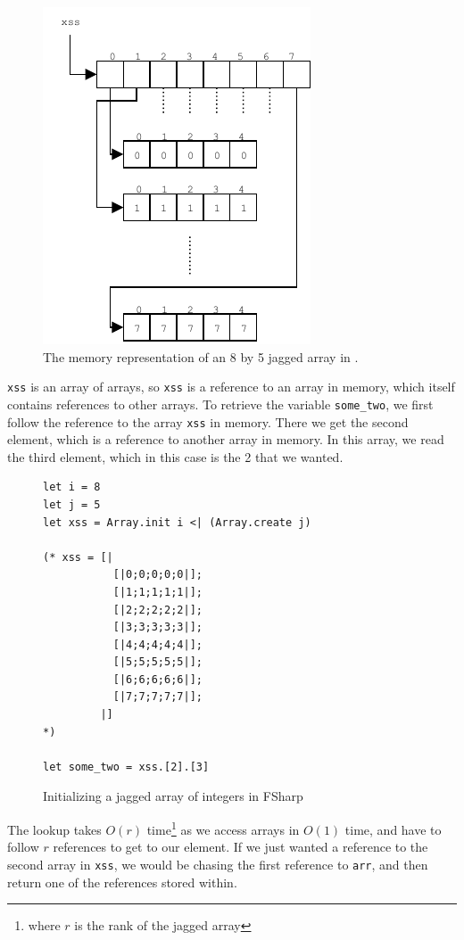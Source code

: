 \begin{figure}
  \centering
  \includegraphics[scale=2]{chapters/figs/jaggedarrays.pdf}
  \caption{The memory representation of an 8 by 5 jagged array in \csharp{}.}
  \label{fig:jaggedarraydrawing}
\end{figure}


\texttt{xss} is an array of arrays, so \texttt{xss} is a reference to an array
in memory, which itself contains references to other arrays.
To retrieve the variable \texttt{some\_two}, we first follow the reference to
the array \texttt{xss} in memory. There we get the second element, which is a
reference to another array in memory. In this array, we read the third element,
which in this case is the 2 that we wanted.

\begin{figure}[h]
  \centering
\begin{verbatim}
let i = 8
let j = 5
let xss = Array.init i <| (Array.create j) 
  
(* xss = [|
           [|0;0;0;0;0|];
           [|1;1;1;1;1|];
           [|2;2;2;2;2|];
           [|3;3;3;3;3|];
           [|4;4;4;4;4|];
           [|5;5;5;5;5|];
           [|6;6;6;6;6|];
           [|7;7;7;7;7|];
         |]
*) 

let some_two = xss.[2].[3]

\end{verbatim}
  \caption{Initializing a jagged array of integers in FSharp}
  \label{fig:jaggedarrayfsharp}
\end{figure}

The lookup takes $O(r)$ time\footnote{where $r$ is the rank of the jagged array} as we access arrays in $O(1)$ time, and have to follow $r$
references to get to our element. If we just wanted a reference to the second
array in \texttt{xss}, we would be chasing the first reference to \texttt{arr},
and then return one of the references stored within.

